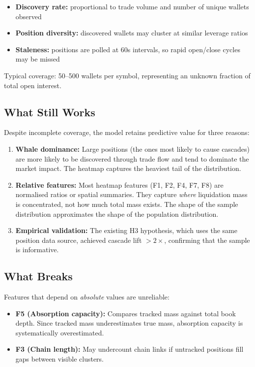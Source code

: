 \documentclass[11pt,a4paper]{article}
\begin{document}
\begin{itemize}
    \item \textbf{Discovery rate:} proportional to trade volume and number of unique wallets observed
    \item \textbf{Position diversity:} discovered wallets may cluster at similar leverage ratios
    \item \textbf{Staleness:} positions are polled at 60s intervals, so rapid open/close cycles may be missed
\end{itemize}

Typical coverage: 50--500 wallets per symbol, representing an unknown fraction of total open interest.

\subsection{What Still Works}

Despite incomplete coverage, the model retains predictive value for three reasons:

\begin{enumerate}
    \item \textbf{Whale dominance:} Large positions (the ones most likely to cause cascades) are more likely to be discovered through trade flow and tend to dominate the market impact. The heatmap captures the heaviest tail of the distribution.
    \item \textbf{Relative features:} Most heatmap features (F1, F2, F4, F7, F8) are normalised ratios or spatial summaries. They capture \textit{where} liquidation mass is concentrated, not how much total mass exists. The shape of the sample distribution approximates the shape of the population distribution.
    \item \textbf{Empirical validation:} The existing H3 hypothesis, which uses the same position data source, achieved cascade lift $> 2\times$, confirming that the sample is informative.
\end{enumerate}

\subsection{What Breaks}

Features that depend on \textit{absolute} values are unreliable:

\begin{itemize}
    \item \textbf{F5 (Absorption capacity):} Compares tracked mass against total book depth. Since tracked mass underestimates true mass, absorption capacity is systematically overestimated.
    \item \textbf{F3 (Chain length):} May undercount chain links if untracked positions fill gaps between visible clusters.
\end{itemize}
\end{document}
